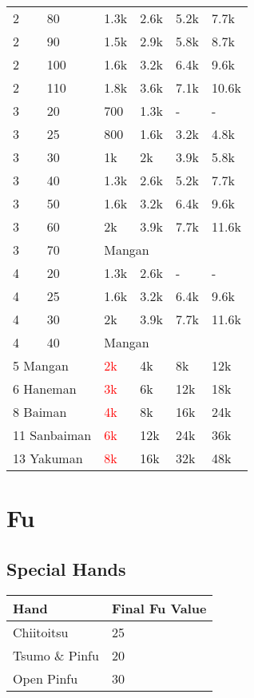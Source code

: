 \documentclass[8pt,a4paper]{extarticle}
\begin{document}
\begin{multicols*}{5}
\begin{tabularx}{\columnwidth}{llXXXX}
2 & 80 & 1.3k & 2.6k & 5.2k & 7.7k \\
2 & 90 & 1.5k & 2.9k & 5.8k & 8.7k \\
2 & 100 & 1.6k & 3.2k & 6.4k & 9.6k \\
2 & 110 & 1.8k & 3.6k & 7.1k & 10.6k \\
3 & 20 & 700 & 1.3k & - & - \\
3 & 25 & 800 & 1.6k & 3.2k & 4.8k \\
3 & 30 & 1k & 2k & 3.9k & 5.8k \\
3 & 40 & 1.3k & 2.6k & 5.2k & 7.7k \\
3 & 50 & 1.6k & 3.2k & 6.4k & 9.6k \\
3 & 60 & 2k & 3.9k & 7.7k & 11.6k \\
3 & 70 & \multicolumn{4}{l}{Mangan} \\
4 & 20 & 1.3k & 2.6k & - & - \\
4 & 25 & 1.6k & 3.2k & 6.4k & 9.6k \\
4 & 30 & 2k & 3.9k & 7.7k & 11.6k \\
4 & 40 & \multicolumn{4}{l}{Mangan} \\ \midrule
\multicolumn{2}{l}{5 Mangan} & \textcolor{red}{2k} & 4k & 8k & 12k \\
\multicolumn{2}{l}{6 Haneman} & \textcolor{red}{3k} & 6k & 12k & 18k \\
\multicolumn{2}{l}{8 Baiman} & \textcolor{red}{4k} & 8k & 16k & 24k \\
\multicolumn{2}{l}{11 Sanbaiman} & \textcolor{red}{6k} & 12k & 24k & 36k \\
\multicolumn{2}{l}{13 Yakuman} & \textcolor{red}{8k} & 16k & 32k & 48k \\ \bottomrule
\end{tabularx}

\section*{Fu}
\subsection*{Special Hands}
\small
\begin{tabularx}{\columnwidth}{lX}
\toprule
Hand & Final Fu Value \\ \midrule
Chiitoitsu & 25 \\
Tsumo \& Pinfu & 20 \\
Open Pinfu & 30 \\ \bottomrule
\end{tabularx}
\smallbreak

\end{multicols*}
\end{document}
